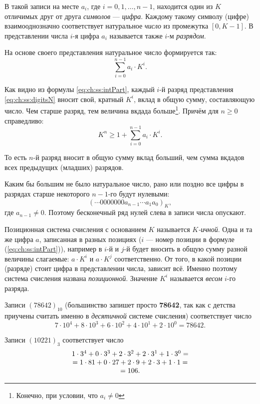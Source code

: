 В такой записи на месте $a_{i}$, где $i=0,1,\ldots, n-1$, находится один из $K$ отличимых друг от друга \emph{символов} --- \emph{цифра}. Каждому такому символу (цифре) взаимооднозначно соответствует натуральное \emph{число} из промежутка $[0,K-1]$. В представлении числа $i$-я цифра $a_i$ называется также $i$-м \emph{разрядом}.

На основе своего представления натуральное число формируется так:
\begin{equation}\label{eq:ch:ss:intPart}
    \sum_{i=0}^{n-1}a_i\cdot K^{i}.
\end{equation}

Как видно из формулы \eqref{eq:ch:ss:intPart}, каждый $i$-й разряд представления \eqref{eq:ch:ss:digitsN} вносит свой, кратный $K^{i}$, вклад в общую сумму, составляющую число. Чем старше разряд, тем величина вкдада больше\footnote{Конечно, при условии, что $a_i\neq 0$}. Причём для $n\geq 0$ справедливо:
\[
    K^n\geq 1+\sum_{i=0}^{n-1}a_i\cdot K^i.
\]

То есть $n$-й разряд вносит в общую сумму вклад больший, чем сумма вкдадов всех предыдущих (младших) разрядов.

Каким бы большим не было натуральное число, рано или поздно все цифры в разрядах старше некоторого $n-1$-го будут нулевыми:
\[
    (\cdots 0000000a_{n-1}\cdots a_{1}a_{0})_K,
\]
где $a_{n-1}\neq 0$. Поэтому бесконечный ряд нулей слева в записи числа опускают.

Позиционная система счисления с основанием $K$ называется \emph{$K$-ичной}. Одна и та же цифра $a$, записанная в разных позициях ($i$ --- номер позиции в формуле (\ref{eq:ch:ss:intPart})), например в $i$-й и $j$-й будет вносить в общую сумму разной величины слагаемые: $a\cdot K^i$ и $a\cdot K^j$ соответственно. От того, в какой позиции (разряде) стоит цифра в представлении числа, зависит всё. Именно поэтому система счисления названа \emph{позиционной}. Значение $K^i$ называется \emph{весом} $i$-го разряда.

\begin{exampl}
    Записи $(78642)_{10}$ (большинство запишет просто \textbf{78642}, так как с детства приучены считать именно в \emph{десятичной} системе счисления) соответствует число
    \[
        7\cdot 10^{4}+
        8\cdot 10^{3}+
        6\cdot 10^{2}+
        4\cdot 10^{1}+
        2\cdot 10^{0}=78642.
    \]
\end{exampl}

\begin{exampl}
    Записи $(10221)_{3}$  соответствует число
    \[
        \begin{array}[c]{c}
            1\cdot 3^{4}+
            0\cdot 3^{3}+
            2\cdot 3^{2}+
            2\cdot 3^{1}+
            1\cdot 3^{0} = \\
            =1\cdot 81+
            0\cdot 27+
            2\cdot 9+
            2\cdot 3+
            1\cdot 1 = \\
            = 106.
        \end{array}
    \]
\end{exampl}


